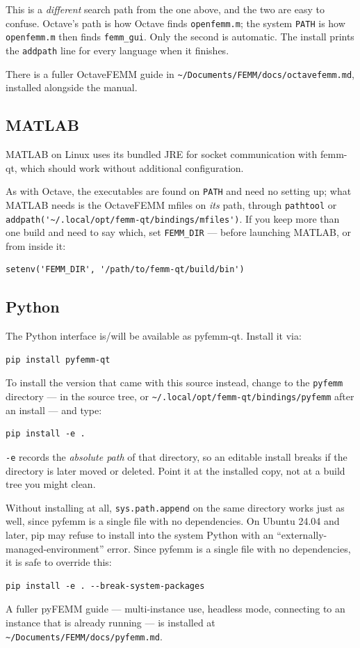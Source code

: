 \documentclass[11pt]{article}
\begin{document}
This is a \emph{different} search path from the one above, and the two are
easy to confuse.  Octave's path is how Octave finds \texttt{openfemm.m};
the system \texttt{PATH} is how \texttt{openfemm.m} then finds
\texttt{femm\_gui}.  Only the second is automatic.  The install prints the
\texttt{addpath} line for every language when it finishes.

There is a fuller OctaveFEMM guide in
\texttt{\textasciitilde/Documents/FEMM/docs/octavefemm.md}, installed
alongside the manual.

\subsection{MATLAB}

MATLAB on Linux uses its bundled JRE for socket communication with
femm-qt, which should work without additional configuration.

As with Octave, the executables are found on \texttt{PATH} and need no
setting up; what MATLAB needs is the OctaveFEMM mfiles on \emph{its} path,
through \verb+pathtool+ or
\verb+addpath('~/.local/opt/femm-qt/bindings/mfiles')+.  If you keep more
than one build and need to say which, set \texttt{FEMM\_DIR} --- before
launching MATLAB, or from inside it:
\begin{lstlisting}
setenv('FEMM_DIR', '/path/to/femm-qt/build/bin')
\end{lstlisting}

\subsection{Python}

The Python interface is/will be available as pyfemm-qt.  Install it via:
\begin{lstlisting}
pip install pyfemm-qt
\end{lstlisting}
To install the version that came with this source instead, change to the
\verb+pyfemm+ directory --- in the source tree, or
\verb+~/.local/opt/femm-qt/bindings/pyfemm+ after an install --- and type:
\begin{lstlisting}
pip install -e .
\end{lstlisting}
\texttt{-e} records the \emph{absolute path} of that directory, so an
editable install breaks if the directory is later moved or deleted.  Point
it at the installed copy, not at a build tree you might clean.

Without installing at all, \verb+sys.path.append+ on the same directory
works just as well, since pyfemm is a single file with no dependencies.
On Ubuntu 24.04 and later, pip may refuse to install into the system
Python with an ``externally-managed-environment'' error.  Since pyfemm
is a single file with no dependencies, it is safe to override this:
\begin{lstlisting}
pip install -e . --break-system-packages
\end{lstlisting}
A fuller pyFEMM guide --- multi-instance use, headless mode, connecting to
an instance that is already running --- is installed at
\texttt{\textasciitilde/Documents/FEMM/docs/pyfemm.md}.
\end{document}
